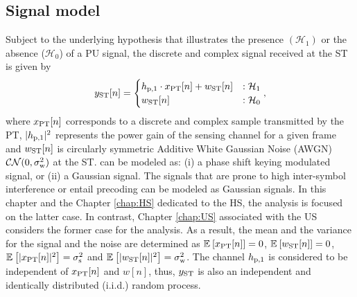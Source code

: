 \subsection{Signal model}
Subject to the underlying hypothesis that illustrates the presence $(\mathcal{H}_1)$ or the absence ($\mathcal{H}_0$) of a PU signal, the discrete and complex signal received at the ST is given by  
\begin{equation}
y_{\text{ST}}[n] = 
\begin{cases}
h_{\text{p,1}} \cdot x_{\text{PT}}[n] + w_{\text{ST}}[n] & : \mathcal{H}_1 \\
w_{\text{ST}}[n] & :\mathcal{H}_0
\end{cases},
\label{eq_IS:sys_mod_p1s}
\end{equation}
where $x_{\text{PT}}[n]$ corresponds to a discrete and complex sample transmitted by the PT, $|h_{\text{p,1}}|^2$ represents the power gain of the sensing channel for a given frame and $w_{\text{ST}}[n]$ is circularly symmetric Additive White Gaussian Noise (AWGN) $\mathcal{CN}(0, \sigma^2_{\text{w}})$ at the ST.  can be modeled as: (i) a phase shift keying modulated signal, or (ii) a Gaussian signal. The signals that are prone to high inter-symbol interference or entail precoding can be modeled as Gaussian signals. In this chapter and the Chapter \ref{chap:HS} dedicated to the HS, the analysis is focused on the latter case. In contrast, Chapter \ref{chap:US} associated with the US considers the former case for the analysis. As a result, the mean and the variance for the signal and the noise are determined as ${\mathbb E}_{}\left[ x_{\text{PT}}[n] \right] = 0$, ${\mathbb E}_{}\left[ w_{\text{ST}}[n] \right] = 0$, ${\mathbb E}_{}\left[ |x_{\text{PT}}[n]|^2 \right] = \sigma^2_{\text{s}}$ and ${\mathbb E}_{}\left[ |w_{\text{ST}}[n]|^2 \right] = \sigma^2_{\text{w}}$. The channel $h_{\text{p,1}}$ is considered to be independent of $x_{\text{PT}}[n]$ and $w[n]$, thus, $y_{\text{ST}}$ is also an independent and identically distributed (i.i.d.) random process. %

